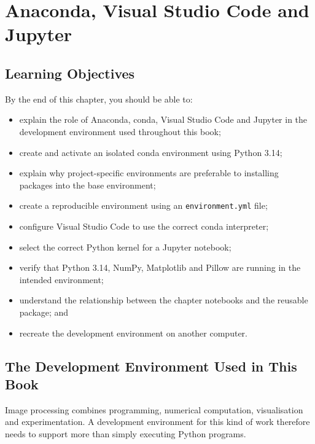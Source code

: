 \chapter{Anaconda, Visual Studio Code and Jupyter}
\label{ch:development-environment}

\section{Learning Objectives}
\label{sec:ch02-learning-objectives}

By the end of this chapter, you should be able to:

\begin{itemize}
    \item explain the role of Anaconda, conda, Visual Studio Code and Jupyter in the development environment used throughout this book;
    \item create and activate an isolated conda environment using Python 3.14;
    \item explain why project-specific environments are preferable to installing packages into the base environment;
    \item create a reproducible environment using an \texttt{environment.yml} file;
    \item configure Visual Studio Code to use the correct conda interpreter;
    \item select the correct Python kernel for a Jupyter notebook;
    \item verify that Python 3.14, NumPy, Matplotlib and Pillow are running in the intended environment;
    \item understand the relationship between the chapter notebooks and the reusable \pyimage{} package; and
    \item recreate the development environment on another computer.
\end{itemize}


\section{The Development Environment Used in This Book}
\label{sec:development-environment}

Image processing combines programming, numerical computation,
visualisation and experimentation. A development environment for this
kind of work therefore needs to support more than simply executing
Python programs.


